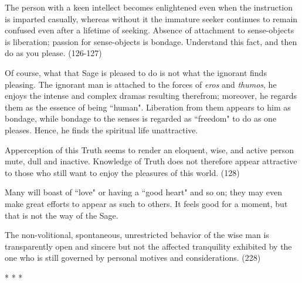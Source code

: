 \begin{quotex}
The person with a keen intellect becomes enlightened even when the instruction is imparted casually, whereas without it
the immature seeker continues to remain confused even after a lifetime of seeking. Absence of attachment to
sense-objects is liberation; passion for sense-objects is bondage. Understand this fact, and then do as you please.
(126-127) 

\end{quotex}
Of course, what that Sage is pleased to do is not what the ignorant finds pleasing. The ignorant man is attached to the
forces of \emph{eros} and \emph{thumos}, he enjoys the intense and complex dramas resulting therefrom; moreover, he
regards them as the essence of being ``human". Liberation from them appears to him as bondage, while bondage to the
senses is regarded as ``freedom" to do as one pleases. Hence, he finds the spiritual life unattractive.

\begin{quotex}
Apperception of this Truth seems to render an eloquent, wise, and active person mute, dull and inactive. Knowledge of
Truth does not therefore appear attractive to those who still want to enjoy the pleasures of this world. (128) 

\end{quotex}
Many will boast of ``love" or having a ``good heart" and so on; they may even make great efforts to appear as such to
others. It feels good for a moment, but that is not the way of the Sage.

\begin{quotex}
The non-volitional, spontaneous, unrestricted behavior of the wise man is transparently open and sincere but not the
affected tranquility exhibited by the one who is still governed by personal motives and considerations. (228) 

\end{quotex}



\begin{center}* * *\end{center}

